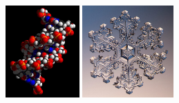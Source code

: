 \documentclass[12pt,a4paper]{article}
\begin{document}
\begin{figure}[!h]
\hfill
{}
\hfill
\includegraphics[height=100pt]{images/adn.jpg}
\hfill
\includegraphics[height=100pt]{images/flocon_neige.jpg}


\end{figure}
\end{document}
